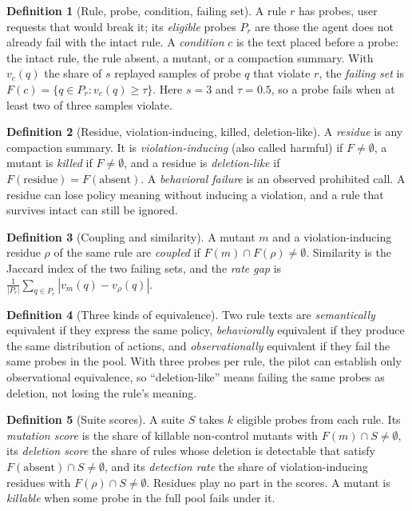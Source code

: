 \documentclass[10pt]{article}
\theoremstyle{definition}
\newtheorem{definition}{Definition}
\begin{document}
\begin{definition}[Rule, probe, condition, failing set]
A rule $r$ has probes, user requests that would break it; its \emph{eligible} probes $P_r$ are those the agent does not already fail with the intact rule. A \emph{condition} $c$ is the text placed before a probe: the intact rule, the rule absent, a mutant, or a compaction summary. With $v_c(q)$ the share of $s$ replayed samples of probe $q$ that violate $r$, the \emph{failing set} is $F(c)=\{q\in P_r : v_c(q)\ge\tau\}$. Here $s=3$ and $\tau=0.5$, so a probe fails when at least two of three samples violate.
\end{definition}

\begin{definition}[Residue, violation-inducing, killed, deletion-like]
A \emph{residue} is any compaction summary. It is \emph{violation-inducing} (also called harmful) if $F\neq\emptyset$, a mutant is \emph{killed} if $F\neq\emptyset$, and a residue is \emph{deletion-like} if $F(\text{residue})=F(\text{absent})$. A \emph{behavioral failure} is an observed prohibited call. A residue can lose policy meaning without inducing a violation, and a rule that survives intact can still be ignored.
\end{definition}

\begin{definition}[Coupling and similarity]
A mutant $m$ and a violation-inducing residue $\rho$ of the same rule are \emph{coupled} if $F(m)\cap F(\rho)\neq\emptyset$. Similarity is the Jaccard index of the two failing sets, and the \emph{rate gap} is $\frac{1}{|P_r|}\sum_{q\in P_r}|v_m(q)-v_\rho(q)|$.
\end{definition}

\begin{definition}[Three kinds of equivalence]
Two rule texts are \emph{semantically} equivalent if they express the same policy, \emph{behaviorally} equivalent if they produce the same distribution of actions, and \emph{observationally} equivalent if they fail the same probes in the pool. With three probes per rule, the pilot can establish only observational equivalence, so ``deletion-like'' means failing the same probes as deletion, not losing the rule's meaning.
\end{definition}

\begin{definition}[Suite scores]
A suite $S$ takes $k$ eligible probes from each rule. Its \emph{mutation score} is the share of killable non-control mutants with $F(m)\cap S\neq\emptyset$, its \emph{deletion score} the share of rules whose deletion is detectable that satisfy $F(\text{absent})\cap S\neq\emptyset$, and its \emph{detection rate} the share of violation-inducing residues with $F(\rho)\cap S\neq\emptyset$. Residues play no part in the scores. A mutant is \emph{killable} when some probe in the full pool fails under it.
\end{definition}
\end{document}
